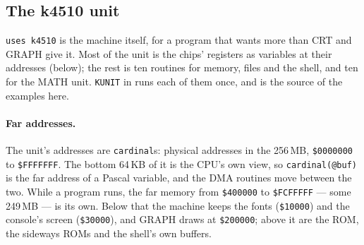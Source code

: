 
\subsection*{The k4510 unit}
\verb|uses k4510| is the machine itself, for a program that wants more
than CRT and GRAPH give it. Most of the unit is the chips' registers as
variables at their addresses (below); the rest is ten routines for memory,
files and the shell, and ten for the MATH unit. \texttt{KUNIT} in
 runs each of them once, and is the source of the
examples here.

\paragraph{Far addresses.} The unit's addresses are \texttt{cardinal}s:
physical addresses in the 256\,MB, \texttt{\$0000000} to
\texttt{\$FFFFFFF}. The bottom 64\,KB of it is the CPU's own view, so
\verb|cardinal(@buf)| is the far address of a Pascal variable, and the
DMA routines move between the two. While a program runs, the far memory
from \texttt{\$400000} to \texttt{\$FCFFFFF} --- some 249\,MB --- is
its own. Below that the machine keeps the fonts (\texttt{\$10000}) and
the console's screen (\texttt{\$30000}), and GRAPH draws at
\texttt{\$200000}; above it are the ROM, the sideways ROMs and the
shell's own buffers.

